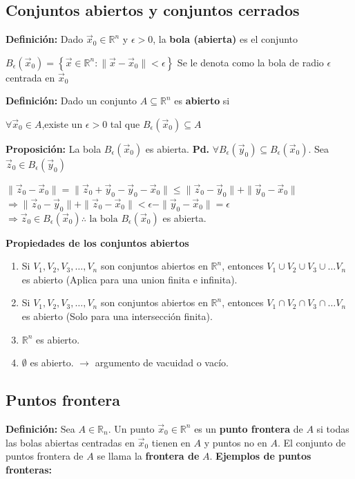 \documentclass[12pt]{article}
\begin{document}
\subsection*{Conjuntos abiertos y conjuntos cerrados}
\noindent\textbf{Definición:} Dado $\vec{x}_0\in\mathbb{R}^n$ y $\epsilon>0$, la \textbf{bola (abierta)} es el conjunto
 \begin{center}
     $B_{\epsilon}(\vec{x}_0)=\left\{\vec{x}\in\mathbb{R}^n:\|\vec{x}-\vec{x}_0\|<\epsilon\right\}$\newline
     Se le denota como la bola de radio $\epsilon$ centrada en $\vec{x}_0$
 \end{center}
 \textbf{Definición:} Dado un conjunto $A\subseteq\mathbb{R}^n$ es \textbf{abierto} si 
 \begin{center}
     $\forall \vec{x}_0\in A$,existe un $\epsilon > 0 $ tal que $B_\epsilon(\vec{x}_0)\subseteq A$ 
 \end{center}
 \textbf{Proposición:} La bola $B_\epsilon(\vec{x}_0)$ es abierta.\newline
 \textbf{Pd.} $\forall B_\epsilon(\vec{y}_0)\subseteq B_\epsilon(\vec{x}_0)$. Sea $\vec{z}_0\in B_{\epsilon}(\vec{y}_0)$
 \begin{center}
    $\|\vec{z}_0-\vec{x}_0\| = \|\vec{z}_0+\vec{y}_0-\vec{y}_0-\vec{x}_0\|\leq \|\vec{z}_0-\vec{y}_0\|+\|\vec{y}_0-\vec{x}_0\|$ \newline
    $\Rightarrow \|\vec{z}_0-\vec{y}_0\|+\|\vec{z}_0-\vec{x}_0\| < \epsilon - \|\vec{y}_0-\vec{x}_0\|=\epsilon$\newline
    $\Rightarrow \vec{z}_0\in B_{\epsilon}(\vec{x}_0) \therefore \text{ la bola }  B_\epsilon(\vec{x}_0)$ es abierta.
 \end{center}
 \newpage
 \noindent \textbf{Propiedades de los conjuntos abiertos}
\begin{enumerate}
    \item Si $V_1,V_2,V_3,\dots, V_n$  son conjuntos abiertos en $\mathbb{R}^n$, entonces $V_1\cup V_2\cup V_3\cup\dots V_n$ es abierto (Aplica para una union finita e infinita).
    \item Si $V_1,V_2,V_3,\dots, V_n$  son conjuntos abiertos en $\mathbb{R}^n$, entonces $V_1\cap V_2\cap V_3 \cap \dots V_n$ es abierto (Solo para una intersección finita).
    \item $\mathbb{R}^n$ es abierto.
    \item $\emptyset$ es abierto. $\rightarrow$ argumento de vacuidad o vacío.
\end{enumerate}
\noindent\subsection*{Puntos frontera}
\noindent \textbf{Definición: } Sea $A \in \mathbb{R}_n$. Un punto $\vec{x}_0 \in \mathbb{R}^n$ es un \textbf{punto frontera}
de $A$ si todas las bolas abiertas centradas en $\vec{x}_0$ tienen en $A$ y puntos no en $A$. \newline \newline
El conjunto de puntos frontera de $A$ se llama la \textbf{frontera de } $A$.\newline
\textbf{Ejemplos de puntos fronteras:}
\end{document}
